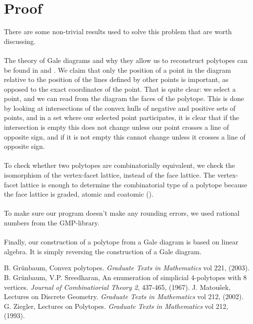 \documentclass[paper=a4, fontsize=11pt]{scrartcl} %
\theoremstyle{definition}
\begin{document}
\section{Proof}
There are some non-trivial results used to solve this problem that are worth discussing.\\
\\
The theory of Gale diagrams and why they allow us to reconstruct polytopes can be found in \cite{Ma02} and \cite{Zi93}. We claim that  only the position of a point in the diagram relative to the position of the lines defined by other points is important, as opposed to the exact coordinates of the point. That is quite clear: we select a point, and we can read from the diagram the faces of the polytope. This is done by looking at intersections of the convex hulls of negative and positive sets of points, and in a set where our selected point participates, it is clear that if the intersection is empty this does not change unless our point crosses a line of opposite sign, and if it is not empty this cannot change unless it crosses a line of opposite sign. \\
\\
To check whether two polytopes are combinatorially equivalent, we check the isomorphism of the vertex-facet lattice, instead of the face lattice. The vertex-facet lattice is enough to determine the combinatorial type of a polytope because the face lattice is graded, atomic and coatomic (\cite{Ma02}).\\
\\
To make sure our program doesn't make any rounding errors, we used rational numbers from the GMP-library.\\
\\
Finally, our construction of a polytope from a Gale diagram is based on linear algebra. It is simply reversing the construction of a Gale diagram.

\begin{thebibliography}{9}
B. Gr{\"u}nbaum, Convex polytopes. \textit{Graduate
Texts in Mathematics} vol 221, (2003).
B. Gr{\"u}nbaum, V.P. Sreedharan, An enumeration of simplicial 4-polytopes with 8 vertices. \textit{Journal of Combinatiorial Theory 2}, 437-465, (1967).
J. Matou{\v s}ek, Lectures on Discrete Geometry. \textit{Graduate
Texts in Mathematics} vol 212, (2002).
G. Ziegler, Lectures on Polytopes. \textit{Graduate
Texts in Mathematics} vol 212, (1993).
\end{thebibliography}
\end{document}
